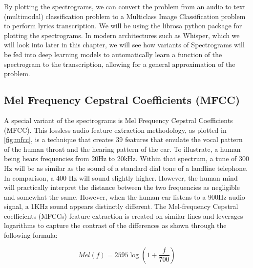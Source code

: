 By plotting the spectrograms, we can convert the problem from an audio to text (multimodal) classification problem to a Multiclass Image Classification problem to perform lyrics transcription. We will be using the librosa \cite{mcfee2015librosa} python package for plotting the spectrograms. In modern architectures such as Whisper, which we will look into later in this chapter, we will see how variants of Spectrograms will be fed into deep learning models to automatically learn a function of the spectrogram to the transcription, allowing for a general approximation of the problem. 

\subsection{Mel Frequency Cepstral Coefficients (MFCC)}%
\label{sec:mfcc}

A special variant of the spectrograms is Mel Frequency Cepstral Coefficients (MFCC). This lossless audio feature extraction methodology, as plotted in \ref{fig:mfcc}, is a technique that creates 39 features that emulate the vocal pattern of the human throat and the hearing pattern of the ear. To illustrate, a human being hears frequencies from 20Hz to 20kHz. Within that spectrum, a tune of 300 Hz will be as similar as the sound of a standard dial tone of a landline telephone. In comparison, a 400 Hz will sound slightly higher. However, the human mind will practically interpret the distance between the two frequencies as negligible and somewhat the same. However, when the human ear listens to a 900Hz audio signal, a 1KHz sound appears distinctly different. The Mel-frequency Cepstral coefficients (MFCCs)  feature extraction is created on similar lines and leverages logarithms to capture the contrast of the differences as shown through the following formula:

\begin{equation}
{Mel}(f)=2595 \log \left(1+\frac{f}{700}\right)
\end{equation}


